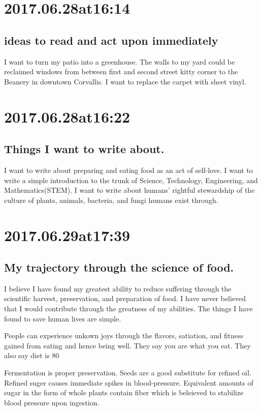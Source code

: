 \begin{enumerate}
\begin{enumerate}
\section*{ 2017.06.28at16:14 }
\subsection*{ ideas to read and act upon immediately }
I want to turn my patio into a greenhouse.
The walls to my yard could be reclaimed windows from between first and second street kitty corner to the Beanery in downtown Corvallis.
I want to replace the carpet with sheet vinyl.

\section*{ 2017.06.28at16:22 }
\subsection*{ Things I want to write about. }
I want to write about preparing and eating food as an act of self-love. I want to write a simple introduction to the trunk of Science, Technology, Engineering, and Mathematics(STEM). I want to write about humans' rightful stewardship of the culture of plants, animals, bacteria, and fungi humans exist through.

\section*{ 2017.06.29at17:39 }
\subsection*{ My trajectory through the science of food. }
I believe I have found my greatest ability to reduce suffering through the scientific harvest, preservation, and preparation of food. I have never believed that I would contribute through the greatness of my abilities. The things I have found to save human lives are simple.

People can experience unkown joys through the flavors, satiation, and fitness gained from eating and hence being well. They say you are what you eat. They also say diet is 80%

Fermentation is proper preservation. Seeds are a good substitute for refined oil. Refined suger causes immediate spikes in blood-pressure. Equivalent amounts of sugar in the form of whole plants contain fiber which is beleieved to stabilize blood pressure upon ingestion.


\end{enumerate}
\end{enumerate}
